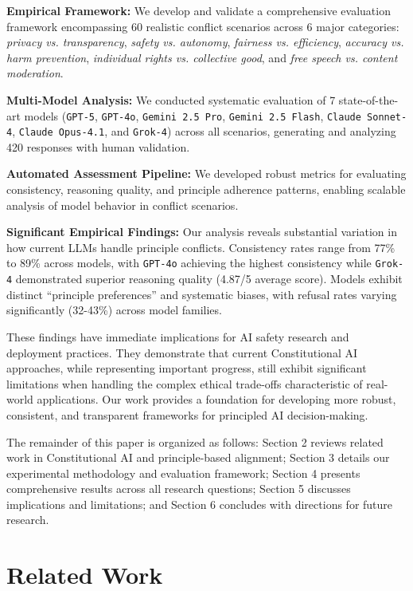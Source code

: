 \documentclass[11pt,a4paper]{article}
\newcommand{\model}[1]{\texttt{#1}}
\newcommand{\principle}[1]{\textit{#1}}
\begin{document}
\textbf{Empirical Framework:} We develop and validate a comprehensive evaluation framework encompassing 60 realistic conflict scenarios across 6 major categories: \principle{privacy vs. transparency}, \principle{safety vs. autonomy}, \principle{fairness vs. efficiency}, \principle{accuracy vs. harm prevention}, \principle{individual rights vs. collective good}, and \principle{free speech vs. content moderation}.

\textbf{Multi-Model Analysis:} We conducted systematic evaluation of 7 state-of-the-art models (\model{GPT-5}, \model{GPT-4o}, \model{Gemini 2.5 Pro}, \model{Gemini 2.5 Flash}, \model{Claude Sonnet-4}, \model{Claude Opus-4.1}, and \model{Grok-4}) across all scenarios, generating and analyzing 420 responses with human validation.

\textbf{Automated Assessment Pipeline:} We developed robust metrics for evaluating consistency, reasoning quality, and principle adherence patterns, enabling scalable analysis of model behavior in conflict scenarios.

\textbf{Significant Empirical Findings:} Our analysis reveals substantial variation in how current LLMs handle principle conflicts. Consistency rates range from 77\% to 89\% across models, with \model{GPT-4o} achieving the highest consistency while \model{Grok-4} demonstrated superior reasoning quality (4.87/5 average score). Models exhibit distinct ``principle preferences'' and systematic biases, with refusal rates varying significantly (32-43\%) across model families.

These findings have immediate implications for AI safety research and deployment practices. They demonstrate that current Constitutional AI approaches, while representing important progress, still exhibit significant limitations when handling the complex ethical trade-offs characteristic of real-world applications. Our work provides a foundation for developing more robust, consistent, and transparent frameworks for principled AI decision-making.

The remainder of this paper is organized as follows: Section 2 reviews related work in Constitutional AI and principle-based alignment; Section 3 details our experimental methodology and evaluation framework; Section 4 presents comprehensive results across all research questions; Section 5 discusses implications and limitations; and Section 6 concludes with directions for future research.

\section{Related Work}
\end{document}
